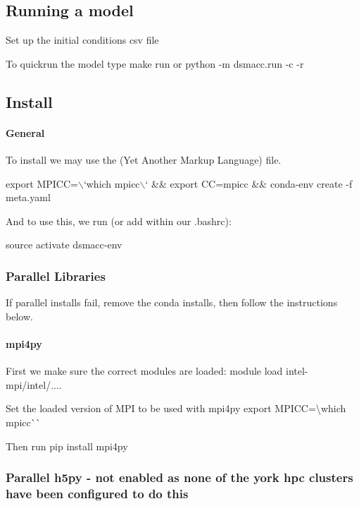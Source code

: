 \subsection*{Running a model}


\begin{DoxyEnumerate}
\item Set up the initial conditions csv file
\item To quickrun the model type {\ttfamily make run} or {\ttfamily python -\/m dsmacc.\+run -\/c -\/r}
\end{DoxyEnumerate}

\subsection*{Install}

\paragraph*{General}

To install we may use the (Yet Another Markup Language) file.


\begin{DoxyCode}
export MPICC=\(\backslash\)`which mpicc\(\backslash\)` &&
export CC=mpicc &&
conda-env create -f meta.yaml
\end{DoxyCode}


And to use this, we run (or add within our .bashrc)\+:

{\ttfamily source activate dsmacc-\/env}

\subsubsection*{Parallel Libraries}

If parallel installs fail, remove the conda installs, then follow the instructions below.

\paragraph*{mpi4py}

First we make sure the correct modules are loaded\+: {\ttfamily module load intel-\/mpi/intel/....}

Set the loaded version of M\+PI to be used with mpi4py {\ttfamily export M\+P\+I\+CC=\textbackslash{}}which mpicc\`{}\`{}

Then run {\ttfamily pip install mpi4py}

\subsubsection*{Parallel h5py -\/ not enabled as none of the york hpc clusters have been configured to do this}

